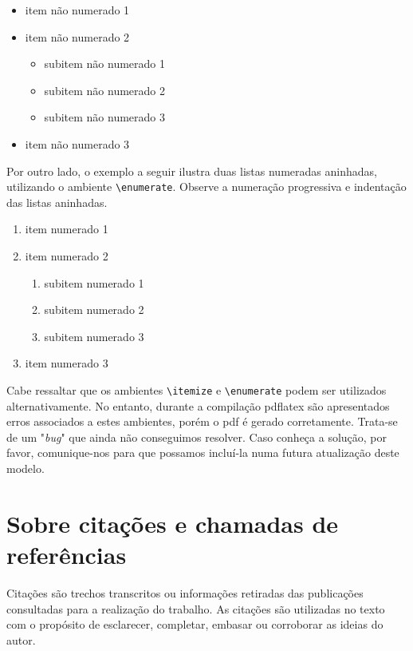 \begin{apendicesenv}
\begin{itemize}
    \item item não numerado 1
    \item item não numerado 2
    \begin{itemize}
        \item subitem não numerado 1
        \item subitem não numerado 2
        \item subitem não numerado 3
    \end{itemize}
    \item item não numerado 3
\end{itemize}

Por outro lado, o exemplo a seguir ilustra duas listas numeradas aninhadas, utilizando o ambiente \verb|\enumerate|. Observe a numeração progressiva e indentação das listas aninhadas.

\begin{enumerate}
    \item item numerado 1
    \item item numerado 2
    \begin{enumerate}
        \item subitem numerado 1
        \item subitem numerado 2
        \item subitem numerado 3
    \end{enumerate}
    \item item numerado 3
\end{enumerate}

Cabe ressaltar que os ambientes \verb|\itemize| e \verb|\enumerate| podem ser utilizados alternativamente. No entanto, durante a compilação pdflatex são apresentados erros associados a estes ambientes, porém o pdf é gerado corretamente. Trata-se de um "\textit{bug}"{} que ainda não conseguimos resolver. Caso conheça a solução, por favor, comunique-nos para que possamos incluí-la numa futura atualização deste modelo.


\chapter{Sobre citações e chamadas de referências}
\label{chap:apSobreCita}

Citações são trechos transcritos ou informações retiradas das publicações consultadas para a realização do trabalho.
As citações são utilizadas no texto com o propósito de esclarecer, completar, embasar ou corroborar as ideias do autor.


\end{apendicesenv}
